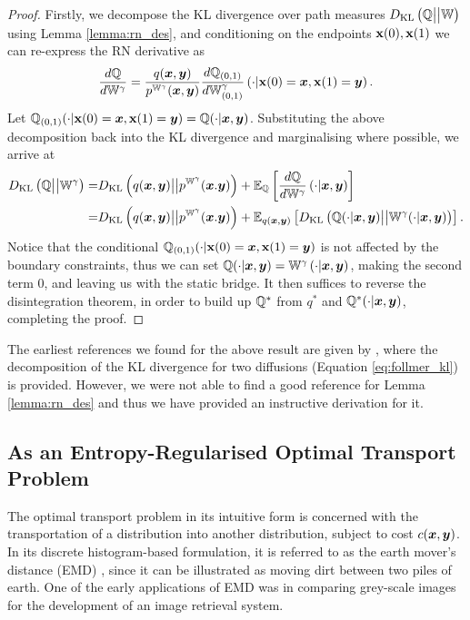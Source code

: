 \documentclass[a4paper,12pt,twoside,openright]{report}
\theoremstyle{definition}
\begin{document}
\begin{proof}
Firstly, we decompose the KL divergence over path measures $D_{\mathrm{KL}}\left({\mathbb{Q}} \big|\big| \mathbb{W}\right)$ using Lemma \ref{lemma:rn_des}, and conditioning on the endpoints ${\mathbf{x}}(0), {\mathbf{x}}(1)$ we can re-express the RN derivative as
\begin{align}
    \frac{d{\mathbb{Q}}}{d\mathbb{W}^\gamma} = \frac{q({\bm{x}}, {\bm{y}})}{p^{\mathbb{W}^{\gamma}}({\bm{x}}, {\bm{y}})}\frac{d{\mathbb{Q}}_{(0,1)}}{d\mathbb{W}_{(0,1)}^\gamma}\left(\cdot | {\mathbf{x}}(0) ={\bm{x}}, {\mathbf{x}}(1) ={\bm{y}}\right).
\end{align}
Let ${\mathbb{Q}}_{(0,1)}(\cdot |  {\mathbf{x}}(0) ={\bm{x}}, {\mathbf{x}}(1) ={\bm{y}}) = {\mathbb{Q}}(\cdot |  {\bm{x}},{\bm{y}})$. Substituting the above decomposition back into the KL divergence and marginalising where possible, we arrive at 
\begin{align} \label{eq:follmer_kl}
    D_{\mathrm{KL}}\left({\mathbb{Q}} \big|\big| \mathbb{W}^{\gamma}\right) =&  D_{\mathrm{KL}}\left(q({\bm{x}}, {\bm{y}}) \big|\big| p^{\mathbb{W}^{\gamma}}({\bm{x}}. {\bm{y}}) \right)  + \mathbb{E}_{{\mathbb{Q}}}\left[\frac{d{\mathbb{Q}}}{d\mathbb{W}^\gamma}\left(\cdot | {\bm{x}}, {\bm{y}}\right)\right] \nonumber \\
    =&  D_{\mathrm{KL}}\left(q({\bm{x}}, {\bm{y}}) \big|\big| p^{\mathbb{W}^{\gamma}}({\bm{x}}. {\bm{y}}) \right)  + \mathbb{E}_{q({\bm{x}},{\bm{y}})}\left[D_{\mathrm{KL}}\left({\mathbb{Q}}(\cdot |  {\bm{x}},{\bm{y}})\big|\big|\mathbb{W}^{\gamma}(\cdot |  {\bm{x}},{\bm{y}})\right)\right].
\end{align}
Notice that the conditional ${\mathbb{Q}}_{(0,1)}(\cdot |  {\mathbf{x}}(0) ={\bm{x}}, {\mathbf{x}}(1) ={\bm{y}})$ is not affected by the boundary constraints, thus we can set ${\mathbb{Q}}(\cdot | {\bm{x}},{\bm{y}}) = \mathbb{W}^\gamma\left(\cdot | {\bm{x}}, {\bm{y}}\right)$, making the second term 0, and leaving us with the static bridge. It then suffices to reverse the disintegration theorem, in order to build up ${\mathbb{Q}}^{*}$ from $q^{*}$ and ${\mathbb{Q}}^{*}(\cdot | {\bm{x}},{\bm{y}})$, completing the proof.
\end{proof}

The earliest references we found for the above result are given by \cite{follmer1988random}, where the decomposition of the KL divergence for two diffusions (Equation \ref{eq:follmer_kl}) is provided. However, we were not able to find a good reference for Lemma \ref{lemma:rn_des} and thus we have provided an instructive derivation for it.
\subsection{As an Entropy-Regularised Optimal Transport Problem}

The optimal transport problem in its intuitive form is concerned with the transportation of a distribution into another distribution, subject to cost $c({\bm{x}},{\bm{y}})$. In its discrete histogram-based formulation, it is referred to as the earth mover's distance (EMD) \citep{levina2001earth}, since it can be illustrated as moving dirt between two piles of earth. One of the early applications of EMD was in comparing grey-scale images for the development of an image retrieval system. 
\end{document}
